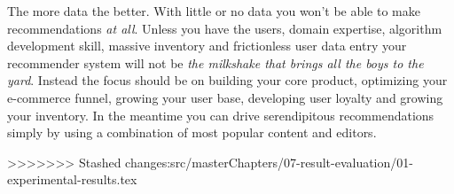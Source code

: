 The more data the better. With little or no data you won't be able to make recommendations \emph{at all}. Unless you have the users, domain expertise, algorithm development skill, massive inventory and frictionless user data entry your recommender
system will not be \emph{the milkshake that brings all the boys to the yard}. Instead the focus should be on building your core product, optimizing your e-commerce funnel, growing your user base, developing user loyalty and growing your inventory. In the meantime you can drive serendipitous recommendations simply by using a combination of most popular content and editors.




>>>>>>> Stashed changes:src/masterChapters/07-result-evaluation/01-experimental-results.tex
